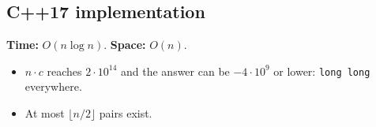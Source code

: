 
\subsection*{C++17 implementation}

\begin{complexitybox}
\textbf{Time:} $O(n\log n)$. \textbf{Space:} $O(n)$.
\end{complexitybox}

\begin{pitfallbox}
\begin{itemize}
  \item $n\cdot c$ reaches $2\cdot10^{14}$ and the answer can be
        $-4\cdot10^9$ or lower: \texttt{long long} everywhere.
  \item At most $\lfloor n/2\rfloor$ pairs exist.
\end{itemize}
\end{pitfallbox}
